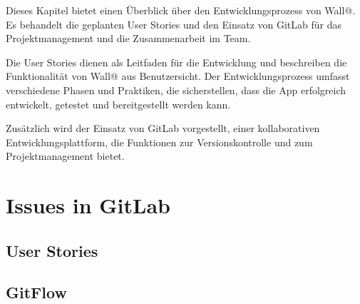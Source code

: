 
Dieses Kapitel bietet einen Überblick über den Entwicklungsprozess von Wall@. 
Es behandelt die geplanten User Stories und den Einsatz von GitLab für das Projektmanagement und die Zusammenarbeit im Team.

Die User Stories dienen als Leitfaden für die Entwicklung und beschreiben die Funktionalität von Wall@ aus Benutzersicht. 
Der Entwicklungsprozess umfasst verschiedene Phasen und Praktiken, die sicherstellen, dass die App erfolgreich entwickelt, getestet und bereitgestellt werden kann.

Zusätzlich wird der Einsatz von GitLab vorgestellt, einer kollaborativen Entwicklungsplattform, die Funktionen zur Versionskontrolle und zum Projektmanagement bietet.

\section{Issues in GitLab}

\subsection{User Stories}

\subsection{GitFlow}

